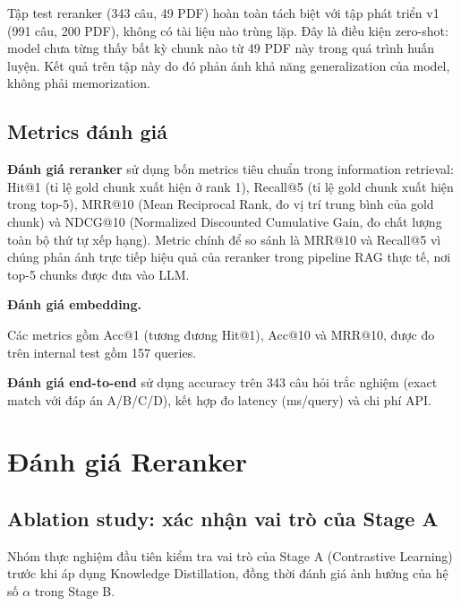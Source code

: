 \documentclass[../DoAn.tex]{subfiles}
\begin{document}
Tập test reranker (343 câu, 49 PDF) hoàn toàn tách biệt với tập phát triển v1 (991 câu, 200 PDF), không có tài liệu nào trùng lặp. Đây là điều kiện zero-shot: model chưa từng thấy bất kỳ chunk nào từ 49 PDF này trong quá trình huấn luyện. Kết quả trên tập này do đó phản ánh khả năng generalization của model, không phải memorization.

\subsection{Metrics đánh giá}
\label{subsection:5.1.3}

\textbf{Đánh giá reranker} sử dụng bốn metrics tiêu chuẩn trong information retrieval: Hit@1 (tỉ lệ gold chunk xuất hiện ở rank 1), Recall@5 (tỉ lệ gold chunk xuất hiện trong top-5), MRR@10 (Mean Reciprocal Rank, đo vị trí trung bình của gold chunk) và NDCG@10 (Normalized Discounted Cumulative Gain, đo chất lượng toàn bộ thứ tự xếp hạng). Metric chính để so sánh là MRR@10 và Recall@5 vì chúng phản ánh trực tiếp hiệu quả của reranker trong pipeline RAG thực tế, nơi top-5 chunks được đưa vào LLM.

\noindent\textbf{Đánh giá embedding.}

Các metrics gồm Acc@1 (tương đương Hit@1), Acc@10 và MRR@10, được đo trên internal test gồm 157 queries.

\textbf{Đánh giá end-to-end} sử dụng accuracy trên 343 câu hỏi trắc nghiệm (exact match với đáp án A/B/C/D), kết hợp đo latency (ms/query) và chi phí API.

\section{Đánh giá Reranker}
\label{section:5.2}

\subsection{Ablation study: xác nhận vai trò của Stage A}
\label{subsection:5.2.1}

Nhóm thực nghiệm đầu tiên kiểm tra vai trò của Stage A (Contrastive Learning) trước khi áp dụng Knowledge Distillation, đồng thời đánh giá ảnh hưởng của hệ số $\alpha$ trong Stage B.
\end{document}

